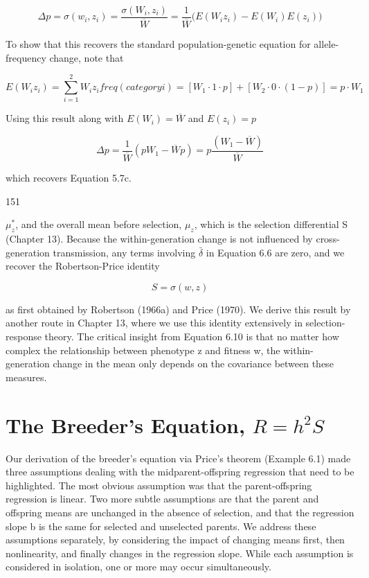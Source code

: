 \documentclass{article}
\begin{document}
\begin{equation}
\Delta p=\sigma(w_{i},z_{i})=\frac{\sigma(W_{i},z_{i})}{\overline{W}}=\frac{1}{\overline{W}}\Biggl(E(W_{i}z_{i})-E(W_{i})E(z_{i})\Biggr)
\end{equation}

To show that this recovers the standard population-genetic equation for allele-frequency change, note that

\begin{equation}
E(W_{i}z_{i})=\sum_{i=1}^{2}W_{i}z_{i}freq(category i)=\left[W_{1}\cdot1\cdot p\right]+\left[W_{2}\cdot0\cdot(1-p)\right]=p\cdot W_{1}
\end{equation}

Using this result along with  $ E(W_i) = \overline{W} $ and  $ E(z_i) = p $

\begin{equation}
\Delta p=\frac{1}{\overline{W}}\left(p W_{1}-\overline{W}p\right)=p\frac{\left(W_{1}-\overline{W}\right)}{\overline{W}}
\end{equation}

which recovers Equation 5.7c.

151

 $ \mu_{z}^{*} $, and the overall mean before selection,  $ \mu_{z} $, which is the selection differential S (Chapter 13). Because the within-generation change is not influenced by cross-generation transmission, any terms involving  $ \bar{\delta} $ in Equation 6.6 are zero, and we recover the Robertson-Price identity

\begin{equation}
S=\sigma(w,z)
\tag{6.10}
\label{eq:6_10}
\end{equation}

as first obtained by Robertson (1966a) and Price (1970). We derive this result by another route in Chapter 13, where we use this identity extensively in selection-response theory. The critical insight from Equation 6.10 is that no matter how complex the relationship between phenotype z and fitness w, the within-generation change in the mean only depends on the covariance between these measures.

\section{The Breeder's Equation,  $ R = h^{2} S $}
Our derivation of the breeder’s equation via Price’s theorem (Example 6.1) made three assumptions dealing with the midparent-offspring regression that need to be highlighted. The most obvious assumption was that the parent-offspring regression is linear. Two more subtle assumptions are that the parent and offspring means are unchanged in the absence of selection, and that the regression slope b is the same for selected and unselected parents. We address these assumptions separately, by considering the impact of changing means first, then nonlinearity, and finally changes in the regression slope. While each assumption is considered in isolation, one or more may occur simultaneously.
\end{document}
